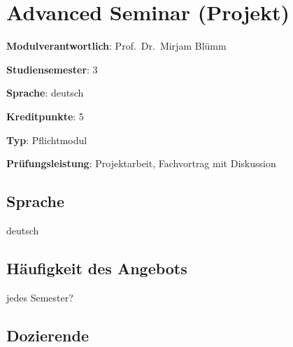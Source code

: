 \hypertarget{advanced-seminar-projektpathlabel....srcmodulbeschreibungen-bachelor-bpo5ba_advanced-seminar}{%
\chapter{Advanced Seminar
(Projekt)\label{../../src/modulbeschreibungen-bachelor-bpo5/BA_Advanced-Seminar}}\label{advanced-seminar-projektpathlabel....srcmodulbeschreibungen-bachelor-bpo5ba_advanced-seminar}}

\begin{modulHead}
\textbf{Modulverantwortlich}: Prof.~Dr.~Mirjam
Blümm
\end{modulHead}
\begin{modulHead}
\textbf{Studiensemester}:
3
\end{modulHead}
\begin{modulHead}
\textbf{Sprache}:
deutsch
\end{modulHead}
\begin{modulHead}
\textbf{Kreditpunkte}:
5
\end{modulHead}
\begin{modulHead}
\textbf{Typ}:
Pflichtmodul
\end{modulHead}
\begin{modulHead}
\textbf{Prüfungsleistung}:
Projektarbeit, Fachvortrag mit Diskussion
\end{modulHead}


\hypertarget{sprachepathlabel....srcmodulbeschreibungen-bachelor-bpo5ba_advanced-seminar}{%
\section*{Sprache\label{../../src/modulbeschreibungen-bachelor-bpo5/BA_Advanced-Seminar}}\label{sprachepathlabel....srcmodulbeschreibungen-bachelor-bpo5ba_advanced-seminar}}

deutsch

\hypertarget{huxe4ufigkeit-des-angebotspathlabel....srcmodulbeschreibungen-bachelor-bpo5ba_advanced-seminar}{%
\section*{Häufigkeit des
Angebots\label{../../src/modulbeschreibungen-bachelor-bpo5/BA_Advanced-Seminar}}\label{huxe4ufigkeit-des-angebotspathlabel....srcmodulbeschreibungen-bachelor-bpo5ba_advanced-seminar}}

jedes Semester?

\hypertarget{dozierendepathlabel....srcmodulbeschreibungen-bachelor-bpo5ba_advanced-seminar}{%
\section*{Dozierende\label{../../src/modulbeschreibungen-bachelor-bpo5/BA_Advanced-Seminar}}\label{dozierendepathlabel....srcmodulbeschreibungen-bachelor-bpo5ba_advanced-seminar}}

